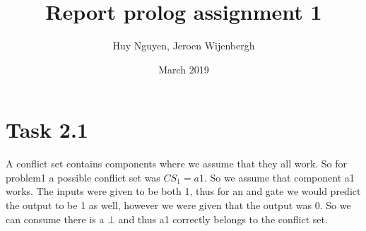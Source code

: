 \documentclass{article}
\title{Report prolog assignment 1}
\author{Huy Nguyen, Jeroen Wijenbergh}
\date{March 2019}
\begin{document}
\maketitle

\section{Task 2.1}



A conflict set contains components where we assume that they all work. So for problem1 a possible conflict set was $CS_1 = {a1}$. So we assume that component a1 works. The inputs were given to be both 1, thus for an and gate we would predict the output to be 1 as well, however we were given that the output was 0. So we can consume there is a $\bot$ and thus a1 correctly belongs to the conflict set. 
\end{document}
